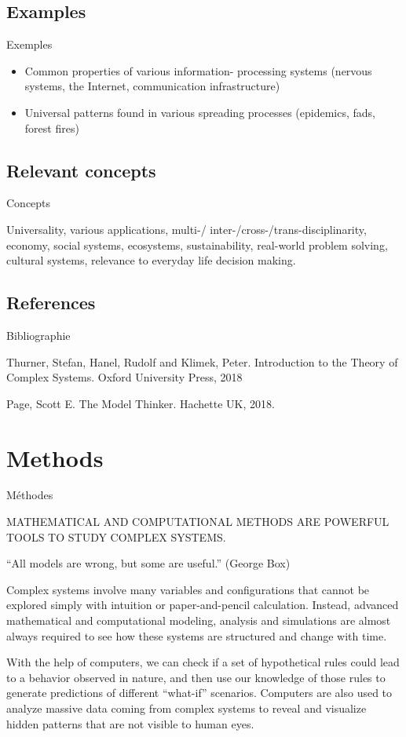 \documentclass[12pt]{article}
\begin{document}
\subsection*{Examples}{Exemples}

\begin{itemize}
	\item Common properties of various information- processing systems (nervous systems, the Internet, communication infrastructure)
	\item Universal patterns found in various spreading processes (epidemics, fads, forest fires)
\end{itemize}



\subsection*{Relevant concepts}{Concepts}

Universality, various applications, multi-/ inter-/cross-/trans-disciplinarity, economy, social systems, ecosystems, sustainability, real-world problem solving, cultural systems, relevance to everyday life decision making.


\subsection*{References}{Bibliographie}

Thurner, Stefan, Hanel, Rudolf and Klimek, Peter. Introduction to the Theory of Complex Systems. Oxford University Press, 2018


Page, Scott E. The Model Thinker. Hachette UK, 2018.



\section{Methods}{Méthodes}

MATHEMATICAL AND COMPUTATIONAL METHODS ARE POWERFUL TOOLS TO STUDY COMPLEX SYSTEMS.


``All models are wrong, but some are useful.'' (George Box)


Complex systems involve many variables and configurations that cannot be explored simply with intuition or paper-and-pencil calculation. Instead, advanced mathematical and computational modeling, analysis and simulations are almost always required to see how these systems are structured and change with time.


With the help of computers, we can check if a set of hypothetical rules could lead to a behavior observed in nature, and then use our knowledge of those rules to generate predictions of different “what-if” scenarios. Computers are also used to analyze massive data coming from complex systems to reveal and visualize hidden patterns that are not visible to human eyes.
\end{document}
